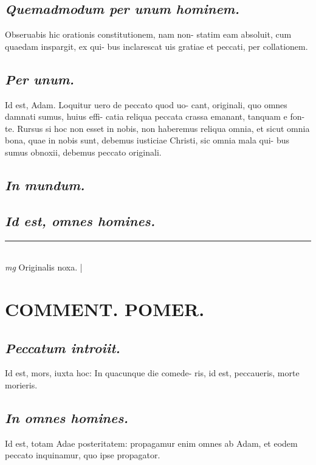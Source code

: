 \documentclass{article}
\begin{document}
\begin{pages}
\subsection*{\textit{Quemadmodum per unum hominem. }}\pstart Obseruabis hic orationis constitutionem, nam non- statim eam absoluit, cum quaedam inspargit, ex qui- bus inclarescat uis gratiae et peccati, per collationem.   \pend
{}
{}
\subsection*{\textit{Per unum. }}\pstart Id est, Adam. Loquitur uero de peccato quod uo- cant, originali, quo omnes damnati sumus, huius effi- catia reliqua peccata crassa emanant, tanquam e fon- te. Rursus si hoc non esset in nobis, non haberemus reliqua omnia, et sicut omnia bona, quae in nobis sunt, debemus iusticiae Christi, sic omnia mala qui- bus sumus obnoxii, debemus peccato originali.   \pend
{}
{}
\subsection*{\textit{In mundum. }}
{}
\subsection*{\textit{Id est, omnes homines.  }}
\vspace{0.5cm}\noindent
\vspace{0.2cm}\rule{1cm}{0.2pt}\\ 
\hspace{0.2cm}\textit{mg}
\footnotesize Originalis noxa.  
\normalsize| 
\section*{COMMENT. POMER.  }
{}
\subsection*{\textit{Peccatum introiit. }}\pstart Id est, mors, iuxta hoc: In quacunque die comede- ris, id est, peccaueris, morte morieris.   \pend
{}
{}
\subsection*{\textit{In omnes homines. }}\pstart Id est, totam Adae posteritatem: propagamur enim omnes ab Adam, et eodem peccato inquinamur, quo ipse propagator.  \pend
{}
{}

\end{pages}
\end{document}
